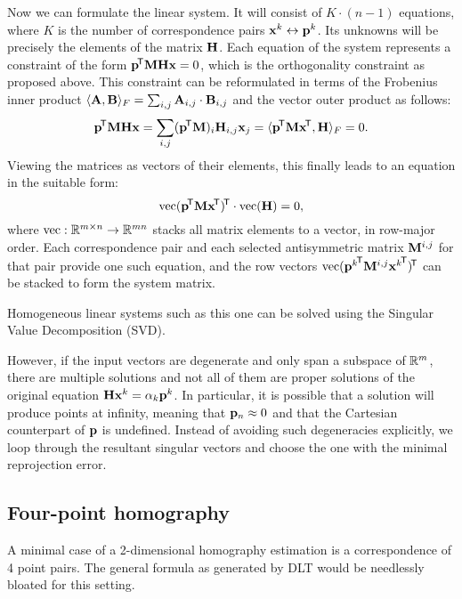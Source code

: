 Now we can formulate the linear system.
It will consist of $K \cdot (n - 1)$ equations, where $K$ is the number of correspondence pairs $\mathbf{x}^k \leftrightarrow \mathbf{p}^k$.
Its unknowns will be precisely the elements of the matrix $\mathbf{H}$.
Each equation of the system represents a constraint of the form $\mathbf{p}^{\!\mathsf{T}} \mathbf{M} \mathbf{H} \mathbf{x} = 0$, which is the orthogonality constraint as proposed above.
This constraint can be reformulated in terms of the Frobenius inner product $\langle \mathbf{A}, \mathbf{B} \rangle_F = \sum_{i, j} \mathbf{A}_{i, j} \cdot \mathbf{B}_{i, j}$ and the vector outer product as follows:
$$\mathbf{p}^{\!\mathsf{T}} \mathbf{M} \mathbf{H} \mathbf{x} = \sum_{i, j} (\mathbf{p}^{\!\mathsf{T}} \mathbf{M})_i \mathbf{H}_{i, j} \mathbf{x}_j = \langle \mathbf{p}^{\!\mathsf{T}} \mathbf{M} \mathbf{x}^{\!\mathsf{T}}, \mathbf{H} \rangle_F = 0.$$
Viewing the matrices as vectors of their elements, this finally leads to an equation in the suitable form:
$$\textrm{vec} (\mathbf{p}^{\!\mathsf{T}} \mathbf{M} \mathbf{x}^{\!\mathsf{T}})^{\!\mathsf{T}} \cdot \textrm{vec}(\mathbf{H}) = 0,$$
where $\textrm{vec} : \mathbb{R}^{m \times n} \rightarrow \mathbb{R}^{mn}$ stacks all matrix elements to a vector, in row-major order.
Each correspondence pair and each selected antisymmetric matrix $\mathbf{M}^{i, j}$ for that pair provide one such equation, and the row vectors $\textrm{vec} ({\mathbf{p}^k}^{\!\mathsf{T}} \mathbf{M}^{i, j} {\mathbf{x}^k}^{\!\mathsf{T}})^{\!\mathsf{T}}$ can be stacked to form the system matrix.

Homogeneous linear systems such as this one can be solved using the Singular Value Decomposition (SVD).

\todo{\dots}
However, if the input vectors are degenerate and only span a subspace of $\mathbb{R}^m$, there are multiple solutions and not all of them are proper solutions of the original equation $\mathbf{H} \mathbf{x}^k = \alpha_k \mathbf{p}^k$.
In particular, it is possible that a solution will produce points at infinity, meaning that $\mathbf{p}_n \approx 0$ and that the Cartesian counterpart of $\mathbf{p}$ is undefined.
Instead of avoiding such degeneracies explicitly, we loop through the resultant singular vectors and choose the one with the minimal reprojection error.

\subsection{Four-point homography}

A minimal case of a 2-dimensional homography estimation is a correspondence of 4 point pairs.
The general formula as generated by DLT would be needlessly bloated for this setting.

